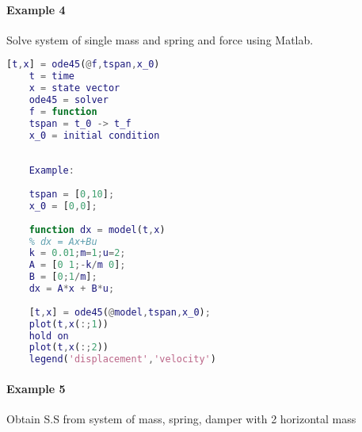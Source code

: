 \paragraph{Example 4} Solve system of single mass and spring and force using Matlab. 
\begin{lstlisting}[language=MATLAB,title=MATLAB Numerical Method using ode45(Runge Kutta)]
	[t,x] = ode45(@f,tspan,x_0)
	t = time
	x = state vector
	ode45 = solver
	f = function
	tspan = t_0 -> t_f
	x_0 = initial condition
	
	
	Example:
	
	tspan = [0,10];
	x_0 = [0,0];
	
	function dx = model(t,x)
	% dx = Ax+Bu
	k = 0.01;m=1;u=2;
	A = [0 1;-k/m 0];
	B = [0;1/m];
	dx = A*x + B*u;
	
	[t,x] = ode45(@model,tspan,x_0);
	plot(t,x(:;1))
	hold on
	plot(t,x(:;2))
	legend('displacement','velocity')
\end{lstlisting}

\paragraph{Example 5} Obtain S.S from system of mass, spring, damper with 2 horizontal mass

\begin{figure}[h]
	\centering
	
\end{figure}

